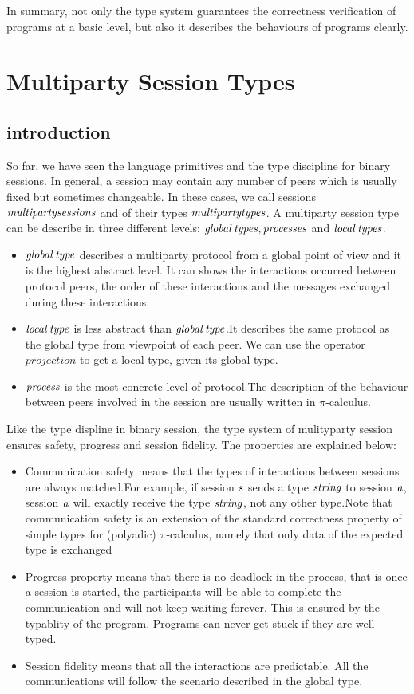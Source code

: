 \documentclass[a4paper]{article}
\begin{document}
In summary, not only the type system guarantees the correctness verification of programs at a basic level, but also it describes the behaviours of programs clearly.






\section{Multiparty Session Types}
\subsection{introduction}
So far, we have seen the language primitives and the type discipline for binary sessions. In general, a session may contain any number of peers which is usually fixed but sometimes changeable. In these cases, we call sessions $\it multiparty sessions$ and of their types $\it multiparty types$. A multiparty session type can be describe in three different levels: $\it  {global \,types, processes}$ and $\it local \, types$.
\begin{itemize}
\item $\it global \,type$ describes a multiparty protocol from a global point of view and it is the highest abstract level. It can shows the interactions occurred between protocol peers, the order of these interactions and the messages exchanged during these interactions.
\item $\it local \,type$ is less abstract than $\it global \,type$.It describes the same protocol as the global type from viewpoint of each peer. We can use the operator $projection$  to get a local type, given its global type.
\item $\it process$ is the most concrete level of protocol.The description of the behaviour between peers involved in the session are usually written in \(\pi\)-calculus.  
\end{itemize}
Like the type displine in binary session, the type system of mulityparty session ensures safety, progress
and session fidelity. The properties are explained below:
\begin{itemize}
\item Communication safety means that the types of interactions between sessions are always matched.For example, if session $s$ sends a type $\it string$ to session $\it a$, session $\it a$ will exactly receive the type $\it string$, not any other type.Note that communication safety is an extension of the standard correctness property of simple types for (polyadic) \(\pi\)-calculus, namely that only data of the expected type is exchanged
\item Progress property means that there is no deadlock in the process, that is once a session is started, the participants will be able to complete the communication and will not keep waiting forever. This is ensured by the typablity of the program. Programs can never get stuck if they are well-typed.
\item Session fidelity means that all the interactions are predictable. All the communications will follow the scenario described in the global type.
\end{itemize}
\end{document}
